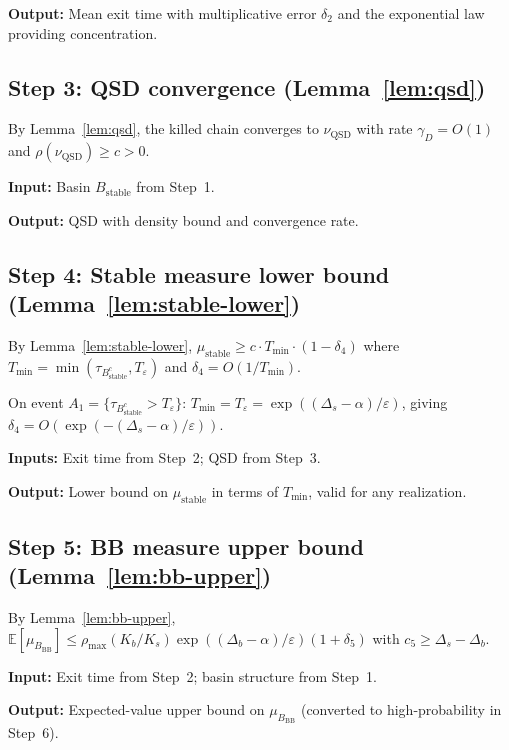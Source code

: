 \documentclass[11pt]{article}
\newcommand{\eps}{\varepsilon}
\newcommand{\Ds}{\Delta_s}
\newcommand{\Db}{\Delta_b}
\newcommand{\Bstable}{B_{\mathrm{stable}}}
\newcommand{\BBB}{B_{\mathrm{BB}}}
\newcommand{\Teps}{T_\eps}
\newcommand{\QSD}{\mathrm{QSD}}
\newcommand{\muBB}{\mu_{\BBB}}
\begin{document}
\textbf{Output:} Mean exit time with multiplicative error $\delta_2$
and the exponential law providing concentration.

\subsection*{Step 3: QSD convergence (Lemma~\ref{lem:qsd})}

By Lemma~\ref{lem:qsd}, the killed chain converges to $\nu_\QSD$
with rate $\gamma_D = O(1)$ and
$\rho(\nu_\QSD) \geq c > 0$.

\textbf{Input:} Basin $\Bstable$ from Step~1.

\textbf{Output:} QSD with density bound and convergence rate.

\subsection*{Step 4: Stable measure lower bound
  (Lemma~\ref{lem:stable-lower})}

By Lemma~\ref{lem:stable-lower},
$\mu_{\mathrm{stable}} \geq c \cdot T_{\min} \cdot (1 - \delta_4)$
where $T_{\min} = \min(\tau_{\Bstable^c}, \Teps)$ and
$\delta_4 = O(1/T_{\min})$.

On event $A_1 = \{\tau_{\Bstable^c} > \Teps\}$:
$T_{\min} = \Teps = \exp((\Ds-\alpha)/\eps)$, giving
$\delta_4 = O(\exp(-(\Ds-\alpha)/\eps))$.

\textbf{Inputs:} Exit time from Step~2; QSD from Step~3.

\textbf{Output:} Lower bound on $\mu_{\mathrm{stable}}$ in terms
of $T_{\min}$, valid for any realization.

\subsection*{Step 5: BB measure upper bound
  (Lemma~\ref{lem:bb-upper})}

By Lemma~\ref{lem:bb-upper},
$\mathbb{E}[\muBB] \leq \rho_{\max}(K_b/K_s)
\exp((\Db - \alpha)/\eps)(1 + \delta_5)$
with $c_5 \geq \Ds - \Db$.

\textbf{Input:} Exit time from Step~2; basin structure from Step~1.

\textbf{Output:} Expected-value upper bound on $\muBB$
(converted to high-probability in Step~6).
\end{document}
